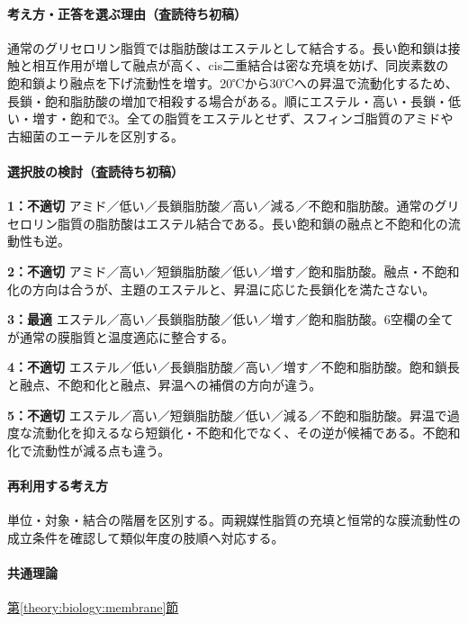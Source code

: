 \paragraph{考え方・正答を選ぶ理由（査読待ち初稿）} 通常のグリセロリン脂質では脂肪酸はエステルとして結合する。長い飽和鎖は接触と相互作用が増して融点が高く、cis二重結合は密な充填を妨げ、同炭素数の飽和鎖より融点を下げ流動性を増す。20℃から30℃への昇温で流動化するため、長鎖・飽和脂肪酸の増加で相殺する場合がある。順にエステル・高い・長鎖・低い・増す・飽和で3。全ての脂質をエステルとせず、スフィンゴ脂質のアミドや古細菌のエーテルを区別する。

\paragraph{選択肢の検討（査読待ち初稿）}\mbox{}\par

\noindent\textbf{1：不適切} アミド／低い／長鎖脂肪酸／高い／減る／不飽和脂肪酸。通常のグリセロリン脂質の脂肪酸はエステル結合である。長い飽和鎖の融点と不飽和化の流動性も逆。\par

\noindent\textbf{2：不適切} アミド／高い／短鎖脂肪酸／低い／増す／飽和脂肪酸。融点・不飽和化の方向は合うが、主題のエステルと、昇温に応じた長鎖化を満たさない。\par

\noindent\textbf{3：最適} エステル／高い／長鎖脂肪酸／低い／増す／飽和脂肪酸。6空欄の全てが通常の膜脂質と温度適応に整合する。\par

\noindent\textbf{4：不適切} エステル／低い／長鎖脂肪酸／高い／増す／不飽和脂肪酸。飽和鎖長と融点、不飽和化と融点、昇温への補償の方向が違う。\par

\noindent\textbf{5：不適切} エステル／高い／短鎖脂肪酸／低い／減る／不飽和脂肪酸。昇温で過度な流動化を抑えるなら短鎖化・不飽和化でなく、その逆が候補である。不飽和化で流動性が減る点も違う。\par

\paragraph{再利用する考え方} 単位・対象・結合の階層を区別する。両親媒性脂質の充填と恒常的な膜流動性の成立条件を確認して類似年度の肢順へ対応する。

\paragraph{共通理論} \hyperref[theory:biology:membrane]{第\ref*{theory:biology:membrane}節}


